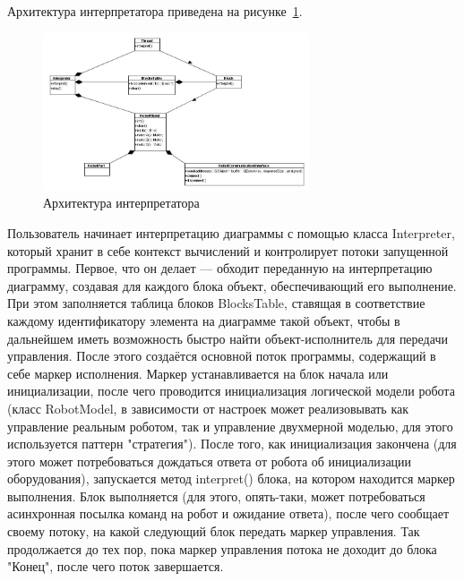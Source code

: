 \documentclass[a4paper]{article}
\begin{document}
Архитектура интерпретатора приведена на рисунке~\ref{interpreterArchitecture}.

\begin{figure} [ht]
  \begin{center}
    \includegraphics[width=0.7\textwidth]{interpreterArchitecture.jpg}
    \caption{Архитектура интерпретатора}
    \label{interpreterArchitecture}
  \end{center}
\end{figure}

Пользователь начинает интерпретацию диаграммы с помощью класса Interpreter, который хранит в себе контекст вычислений и контролирует потоки запущенной программы. Первое, что он делает --- обходит переданную на интерпретацию диаграмму, создавая для каждого блока объект, обеспечивающий его выполнение. При этом заполняется таблица блоков BlocksTable, ставящая в соответствие каждому идентификатору элемента на диаграмме такой объект, чтобы в дальнейшем иметь возможность быстро найти объект-исполнитель для передачи управления. После этого создаётся основной поток программы, содержащий в себе маркер исполнения. Маркер устанавливается на блок начала или инициализации, после чего проводится инициализация логической модели робота (класс RobotModel, в зависимости от настроек может реализовывать как управление реальным роботом, так и управление двухмерной моделью, для этого используется паттерн "стратегия"). После того, как инициализация закончена (для этого может потребоваться дождаться ответа от робота об инициализации оборудования), запускается метод interpret() блока, на котором находится маркер выполнения. Блок выполняется (для этого, опять-таки, может потребоваться асинхронная посылка команд на робот и ожидание ответа), после чего сообщает своему потоку, на какой следующий блок передать маркер управления. Так продолжается до тех пор, пока маркер управления потока не доходит до блока "Конец", после чего поток завершается.
\end{document}
